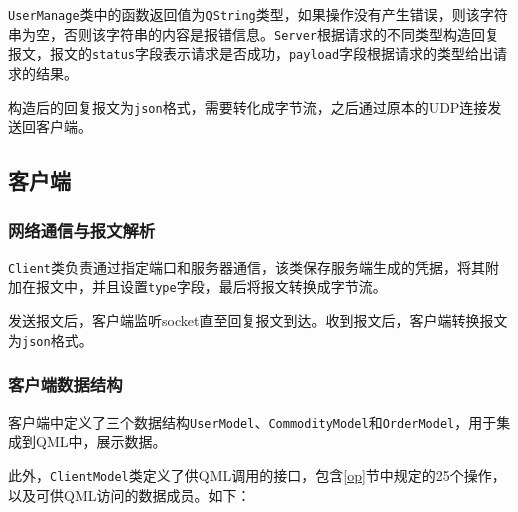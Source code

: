 \documentclass[lang=cn,11pt,a4paper,cite=authornum]{paper}
\begin{document}
\texttt{UserManage}类中的函数返回值为\texttt{QString}类型，如果操作没有产生错误，则该字符串为空，否则该字符串的内容是报错信息。\texttt{Server}根据请求的不同类型构造回复报文，报文的\texttt{status}字段表示请求是否成功，\texttt{payload}字段根据请求的类型给出请求的结果。

构造后的回复报文为\texttt{json}格式，需要转化成字节流，之后通过原本的UDP连接发送回客户端。

\subsection{客户端}

\subsubsection{网络通信与报文解析}

\texttt{Client}类负责通过指定端口和服务器通信，该类保存服务端生成的凭据，将其附加在报文中，并且设置\texttt{type}字段，最后将报文转换成字节流。

发送报文后，客户端监听socket直至回复报文到达。收到报文后，客户端转换报文为\texttt{json}格式。

\subsubsection{客户端数据结构}

客户端中定义了三个数据结构\texttt{UserModel}、\texttt{CommodityModel}和\texttt{OrderModel}，用于集成到QML中，展示数据。

此外，\texttt{ClientModel}类定义了供QML调用的接口，包含\ref{op}节中规定的25个操作，以及可供QML访问的数据成员。如下：
\end{document}
